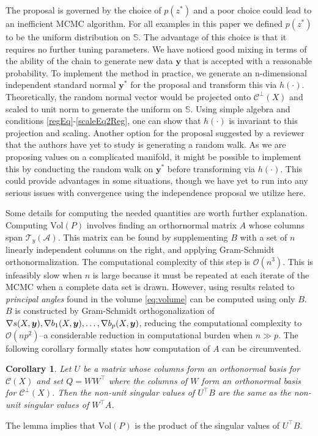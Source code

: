 \documentclass[ba]{imsart}
\newcommand{\by}{\mbox{\boldmath $y$}}
\newcommand{\mb}{\mathbf}
\newcommand{\mc}{\mathcal}
\newtheorem{corollary}[theorem]{\bf Corollary}
\newcommand{\response}[1]{{\color{blue}#1}}
\begin{document}
\response{The proposal is governed by the choice of $p(z^{*})$ and a poor choice could lead to an inefficient MCMC algorithm. For all examples in this paper we defined $p(z^{*})$ to be the uniform distribution on $\mathbb{S}$. The advantage of this choice is that it requires no further tuning parameters.  We have noticed good mixing in terms of the ability of the chain to generate new data $\mb y$ that is accepted with a reasonable probability. To implement the method in practice, we generate an n-dimensional independent standard normal $\mb y^{*}$ for the proposal and transform this via $h(\cdot)$. Theoretically, the random normal vector would be projected onto $\mc{C}^{\perp}(X)$ and scaled to unit norm to generate the uniform on $\mathbb{S}$. Using simple algebra and conditions \ref{regEq}-\ref{scaleEq2Reg}, one can show that $h(\cdot)$ is invariant to this projection and scaling. Another option for the proposal suggested by a reviewer that the authors have yet to study is generating a random walk. As we are proposing values on a complicated manifold, it might be possible to implement this by conducting the random walk on $\mb y^{*}$ before transforming via $h(\cdot)$. This could provide advantages in some situations, though we have yet to run into any serious issues with convergence using the independence proposal we utilize here.}

Some details for computing the needed quantities are worth further explanation. Computing $\text{Vol} (P)$ involves finding an orthornormal matrix $A$ whose columns span $\mc T_{y}(\mc A)$. This matrix can be found by supplementing $B$ with a set of $n$ linearly independent columns on the right, and applying Gram-Schmidt orthonormalization.  The computational complexity of this step is $\mc O(n^3)$.  This is infeasibly slow when $n$ is large because it must be repeated at each iterate of the MCMC when a complete data set is drawn.  However, using results related to \textit{principal angles} found in \cite{miao1992} the volume \eqref{eq:volume} can be computed using only $B$. $B$ is constructed by Gram-Schmidt orthogonalization of $\nabla s(X,\by), \nabla b_1(X,\by),\dots, \nabla b_p(X,\by)$, reducing the computational complexity to $\mc O(np^2)$--a 
considerable reduction in computational burden when $n \gg p$. 
The following corollary formally states how computation of $A$ can be circumvented. 
\begin{corollary}
\label{theorem:sings}
Let $U$ be a matrix whose columns form an orthonormal basis for $\mc C (X)$ and set $Q=WW^{\top}$ where the columns of $W$ form an orthonormal basis for $\mc{C}^\perp(X)$. Then the non-unit singular values of $U^\top B$ are the same as the non-unit singular values of $W^\top A$.
\end{corollary} 
\noindent The lemma implies that $\text{Vol} (P)$ is the product of the singular values of $U^\top B$. 
\end{document}
